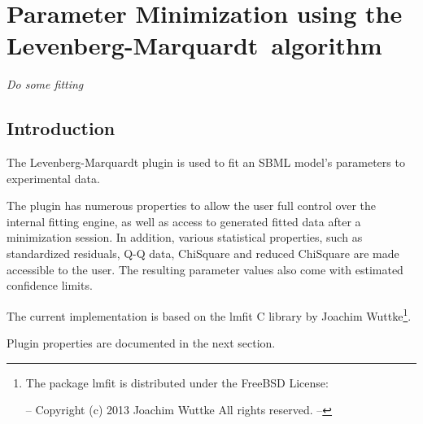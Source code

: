 \newcommand{\pname}{Levenberg-Marquardt}

\chapter*{Parameter Minimization using the \pname\ algorithm}
\setcounter{chapter}{1}
\emph{Do some fitting}
\section{Introduction}
The Levenberg-Marquardt plugin is used to fit an SBML model's parameters to experimental data.

The plugin has numerous properties to allow the user full control over the internal fitting engine, as well as
access to generated fitted data after a minimization session. In addition, various statistical properties, such as standardized residuals, Q-Q data, ChiSquare and reduced ChiSquare are made accessible to the user. The resulting parameter values also come with estimated confidence limits.

The current implementation is based on the lmfit C library by Joachim Wuttke\footnote{The package lmfit is distributed under the FreeBSD License:

--
  Copyright (c) 2013 Joachim Wuttke All rights reserved.
--}.


Plugin properties are documented in the next section.

